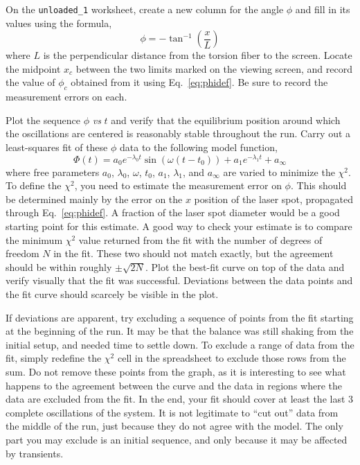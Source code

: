 \documentclass{revtex4}
\begin{document}
On the {\tt unloaded\_1} worksheet, create a new column for the angle
$\phi$ and fill in its values using the formula,
\begin{equation}
\phi=-\tan^{-1}\left(\frac{x}{L}\right)
\label{eq:phidef}
\end{equation}
where $L$ is the perpendicular distance from the torsion fiber to the
screen.  Locate the midpoint $x_c$ between the two limits marked on the
viewing screen, and record the value of $\phi_c$ obtained from it using
Eq.~\ref{eq:phidef}.  Be sure to record the measurement errors on each.

Plot the sequence $\phi$ {\em vs} $t$ and verify that the
equilibrium position around which the oscillations are centered is
reasonably stable throughout the run.  Carry out a least-squares fit
of these $\phi$ data to the following model function,
\begin{equation}
\Phi(t) = a_0 e^{-\lambda_0 t}\sin(\omega(t-t_0)) + a_1 e^{-\lambda_1 t}
+a_{\infty}
\label{eq:fitfunc}
\end{equation}
where free parameters $a_0$, $\lambda_0$, $\omega$, $t_0$, $a_1$, $\lambda_1$,
and $a_{\infty}$ are varied to minimize the $\chi^2$.  To define the $\chi^2$,
you need to estimate the measurement error on $\phi$.  This should be
determined mainly by the error on the $x$ position of the laser spot,
propagated through Eq.~\ref{eq:phidef}.  A fraction of the laser spot
diameter would be a good starting point for this estimate.  A good way
to check your estimate is to compare the minimum $\chi^2$ value returned
from the fit with the number of degrees of freedom $N$ in the fit.  These
two should not match exactly, but the agreement should be within roughly
$\pm\sqrt{2N}$.  Plot the best-fit curve on top of the data and verify visually 
that the fit was successful.  Deviations between the data points and the
fit curve should scarcely be visible in the plot.

If deviations are apparent, try excluding a sequence of points from the
fit starting at the beginning of the run.  It may be that the balance was
still shaking from the initial setup, and needed time to settle down.
To exclude a range of data from the fit, simply redefine the $\chi^2$ cell
in the spreadsheet to exclude those rows from the sum. Do not remove these
points from the graph, as it is interesting to see what happens to the
agreement between the curve and the data in regions where the data are
excluded from the fit.  In the end, your fit should cover at least the
last 3 complete oscillations of the system.  It is not legitimate to
``cut out'' data from the middle of the run, just because they do not
agree with the model.  The only part you may exclude is an initial sequence,
and only because it may be affected by transients.
\end{document}
